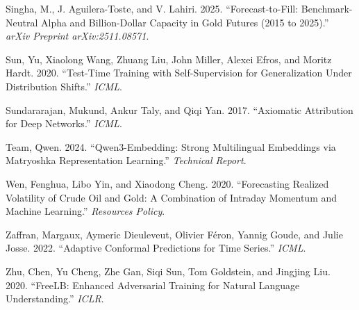 \documentclass[
]{article}
\newlength{\cslhangindent}
\newenvironment{CSLReferences}[2] %
 {\begin{list}{}{%
  \setlength{\itemindent}{0pt}
  \setlength{\leftmargin}{0pt}
  \setlength{\parsep}{0pt}
  \ifodd #1
   \setlength{\leftmargin}{\cslhangindent}
   \setlength{\itemindent}{-1\cslhangindent}
  \fi
  \setlength{\itemsep}{#2\baselineskip}}}
 {\end{list}}
\begin{document}
\begin{CSLReferences}{1}{1}
Singha, M., J. Aguilera-Toste, and V. Lahiri. 2025. {``Forecast-to-Fill:
Benchmark-Neutral Alpha and Billion-Dollar Capacity in Gold Futures
(2015 to 2025).''} \emph{arXiv Preprint arXiv:2511.08571}.

Sun, Yu, Xiaolong Wang, Zhuang Liu, John Miller, Alexei Efros, and
Moritz Hardt. 2020. {``Test-Time Training with Self-Supervision for
Generalization Under Distribution Shifts.''} \emph{ICML}.

Sundararajan, Mukund, Ankur Taly, and Qiqi Yan. 2017. {``Axiomatic
Attribution for Deep Networks.''} \emph{ICML}.

Team, Qwen. 2024. {``Qwen3-Embedding: Strong Multilingual Embeddings via
Matryoshka Representation Learning.''} \emph{Technical Report}.

Wen, Fenghua, Libo Yin, and Xiaodong Cheng. 2020. {``Forecasting
Realized Volatility of Crude Oil and Gold: A Combination of Intraday
Momentum and Machine Learning.''} \emph{Resources Policy}.

Zaffran, Margaux, Aymeric Dieuleveut, Olivier Féron, Yannig Goude, and
Julie Josse. 2022. {``Adaptive Conformal Predictions for Time Series.''}
\emph{ICML}.

Zhu, Chen, Yu Cheng, Zhe Gan, Siqi Sun, Tom Goldstein, and Jingjing Liu.
2020. {``FreeLB: Enhanced Adversarial Training for Natural Language
Understanding.''} \emph{ICLR}.

\end{CSLReferences}
\end{document}
